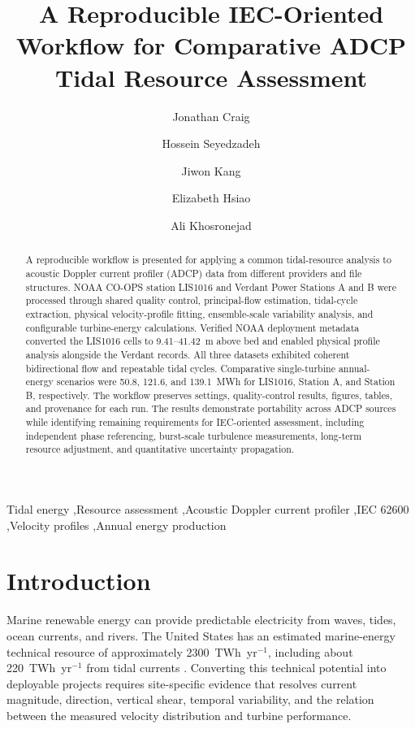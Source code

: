 \documentclass[12pt,sort&compress]{elsarticle}
\begin{document}
\begin{frontmatter}

\title{A Reproducible IEC-Oriented Workflow for Comparative ADCP Tidal Resource Assessment}

\author[sbu]{Jonathan Craig}
\author[sbu]{Hossein Seyedzadeh}
\author{Jiwon Kang}
\author{Elizabeth Hsiao}
\author[sbu]{Ali Khosronejad}
\address[sbu]{Department of Civil Engineering, Stony Brook University, Stony Brook, NY 11794, USA}

\begin{abstract}
A reproducible workflow is presented for applying a common tidal-resource analysis to acoustic Doppler current profiler (ADCP) data from different providers and file structures. NOAA CO-OPS station LIS1016 and Verdant Power Stations A and B were processed through shared quality control, principal-flow estimation, tidal-cycle extraction, physical velocity-profile fitting, ensemble-scale variability analysis, and configurable turbine-energy calculations. Verified NOAA deployment metadata converted the LIS1016 cells to 9.41--41.42~m above bed and enabled physical profile analysis alongside the Verdant records. All three datasets exhibited coherent bidirectional flow and repeatable tidal cycles. Comparative single-turbine annual-energy scenarios were 50.8, 121.6, and 139.1~MWh for LIS1016, Station A, and Station B, respectively. The workflow preserves settings, quality-control results, figures, tables, and provenance for each run. The results demonstrate portability across ADCP sources while identifying remaining requirements for IEC-oriented assessment, including independent phase referencing, burst-scale turbulence measurements, long-term resource adjustment, and quantitative uncertainty propagation.
\end{abstract}

\begin{keyword}
Tidal energy \sep Resource assessment \sep Acoustic Doppler current profiler \sep IEC 62600 \sep Velocity profiles \sep Annual energy production
\end{keyword}

\end{frontmatter}
\clearpage
\section{Introduction}
\label{sec:intro}

Marine renewable energy can provide predictable electricity from waves, tides, ocean currents, and rivers. The United States has an estimated marine-energy technical resource of approximately 2300~TWh~yr$^{-1}$, including about 220~TWh~yr$^{-1}$ from tidal currents \cite{nrel_2021}. Converting this technical potential into deployable projects requires site-specific evidence that resolves current magnitude, direction, vertical shear, temporal variability, and the relation between the measured velocity distribution and turbine performance.
\end{document}
